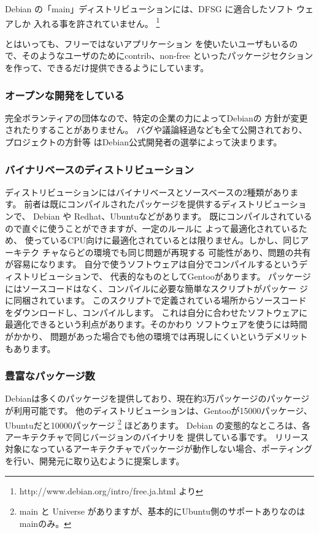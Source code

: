 \documentclass[mingoth,a4paper]{jsarticle}
\begin{document}
Debian の「main」ディストリビューションには、DFSG に適合したソフト
ウェアしか 入れる事を許されていません。
\footnote{http://www.debian.org/intro/free.ja.html より}

とはいっても、フリーではないアプリケーション
を使いたいユーザもいるので、そのようなユーザのためにcontrib、non-free
といったパッケージセクションを作って、できるだけ提供できるようにしています。

\subsubsection{オープンな開発をしている}
完全ボランティアの団体なので、特定の企業の力によってDebianの
方針が変更されたりすることがありません。
バグや議論経過なども全て公開されており、プロジェクトの方針等
はDebian公式開発者の選挙によって決まります。

\subsubsection{バイナリベースのディストリビューション}
ディストリビューションにはバイナリベースとソースベースの2種類があります。
前者は既にコンパイルされたパッケージを提供するディストリビューションで、
Debian や Redhat、Ubuntuなどがあります。
既にコンパイルされているので直ぐに使うことができますが、一定のルールに
よって最適化されているため、
使っているCPU向けに最適化されているとは限りません。しかし、同じアーキテク
チャならどの環境でも同じ問題が再現する
可能性があり、問題の共有が容易になります。
自分で使うソフトウェアは自分でコンパイルするというディストリビューションで、
代表的なものとしてGentooがあります。
パッケージにはソースコードはなく、コンパイルに必要な簡単なスクリプトがパッケー
ジに同梱されています。
このスクリプトで定義されている場所からソースコードをダウンロードし、コンパイルします。
これは自分に合わせたソフトウェアに最適化できるという利点があります。そのかわり
ソフトウェアを使うには時間がかかり、
問題があった場合でも他の環境では再現しにくいというデメリットもあります。

\subsubsection{豊富なパッケージ数}

Debianは多くのパッケージを提供しており、現在約3万パッケージのパッケージが利用可能です。
他のディストリビューションは、Gentooが15000パッケージ、Ubuntuだと10000パッケージ
\footnote{main と Universe がありますが、基本的にUbuntu側のサポートありなのはmainのみ。}
ほどあります。
Debian の変態的なところは、各アーキテクチャで同じバージョンのバイナリを
提供している事です。
リリース対象になっているアーキテクチャでパッケージが動作しない場合、ポーティング
を行い、開発元に取り込むように提案します。
\end{document}
